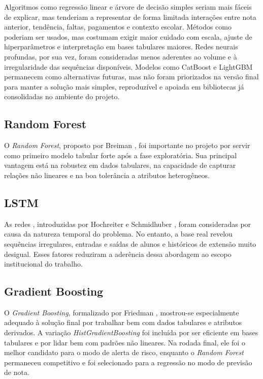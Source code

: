 Algoritmos como regress\~ao linear e \'arvore de decis\~ao simples seriam mais f\'aceis de explicar, mas tenderiam a representar de forma limitada intera\c{c}\~oes entre nota anterior, tend\^encia, faltas, pagamentos e contexto escolar. M\'etodos como  poderiam ser usados, mas costumam exigir maior cuidado com escala, ajuste de hiperpar\^ametros e interpreta\c{c}\~ao em bases tabulares maiores. Redes neurais profundas, por sua vez, foram consideradas menos aderentes ao volume e \`a irregularidade das sequ\^encias dispon\'iveis. Modelos como CatBoost e LightGBM permanecem como alternativas futuras, mas n\~ao foram priorizados na vers\~ao final para manter a solu\c{c}\~ao mais simples, reproduz\'ivel e apoiada em bibliotecas j\'a consolidadas no ambiente do projeto.

\subsection{Random Forest}

O \textit{Random Forest}, proposto por Breiman \cite{breiman2001}, foi importante no projeto por servir como primeiro modelo tabular forte ap\'os a fase explorat\'oria. Sua principal vantagem est\'a na robustez em dados tabulares, na capacidade de capturar rela\c{c}\~oes n\~ao lineares e na boa toler\^ancia a atributos heterog\^eneos.

\subsection{LSTM}

As redes , introduzidas por Hochreiter e Schmidhuber \cite{hochreiter1997}, foram consideradas por causa da natureza temporal do problema. No entanto, a base real revelou sequ\^encias irregulares, entradas e sa\'idas de alunos e hist\'oricos de extens\~ao muito desigual. Esses fatores reduziram a ader\^encia dessa abordagem ao escopo institucional do trabalho.

\subsection{Gradient Boosting}

O \textit{Gradient Boosting}, formalizado por Friedman \cite{friedman2001}, mostrou-se especialmente adequado \`a solu\c{c}\~ao final por trabalhar bem com dados tabulares e atributos derivados. A varia\c{c}\~ao \textit{HistGradientBoosting} foi inclu\'ida por ser eficiente em bases tabulares e por lidar bem com padr\~oes n\~ao lineares. Na rodada final, ele foi o melhor candidato para o modo de alerta de risco, enquanto o \textit{Random Forest} permaneceu competitivo e foi selecionado para a regress\~ao no modo de previs\~ao de nota.

